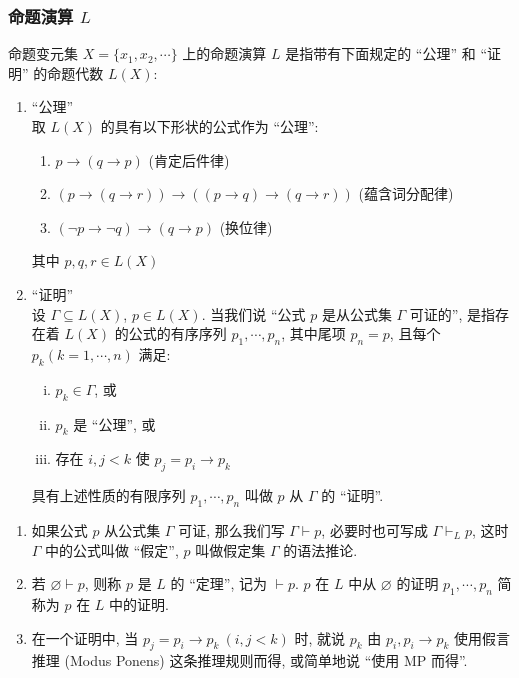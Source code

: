 \documentclass[
    color=black,
    device=normal,
    lang=cn
]{elegantnote}
\begin{document}
\subsubsection{命题演算 \texorpdfstring{$L$}{L}}
\begin{definition}[命题演算 $L$]
    \label{def:2.3}
    命题变元集 $X=\{x_1, x_2,\cdots\}$ 上的命题演算 $L$ 是指带有下面规定的 ``公理'' 和 ``证明'' 的命题代数 $L(X)$:
    \begin{enumerate}[(1)]
        \item ``公理''\\
              取 $L(X)$ 的具有以下形状的公式作为 ``公理'':
              \begin{enumerate}[label=(L\arabic*)]
                  \item $p\to (q\to p)$ \hfill (肯定后件律)
                  \item $(p\to (q\to r))\to ((p\to q)\to (q\to r))$ \hfill (蕴含词分配律)
                  \item $(\lnot p\to \lnot q)\to (q\to p)$ \hfill (换位律)
              \end{enumerate}
              其中 $p,q,r\in L(X)$
        \item ``证明''\\
              设 $\Gamma\subseteq L(X)$, $p\in L(X)$. 当我们说 ``公式 $p$ 是从公式集 $\Gamma$ 可证的'', 是指存在着 $L(X)$ 的公式的有序序列 $p_1, \cdots, p_n$, 其中尾项 $p_n=p$, 且每个 $p_k(k=1,\cdots, n)$ 满足:
              \begin{enumerate}[(i)]
                  \item $p_k\in\Gamma$, 或
                  \item $p_k$ 是 ``公理'', 或
                  \item 存在 $i,j < k$ 使 $p_j=p_i\to p_k$
              \end{enumerate}
              具有上述性质的有限序列 $p_1, \cdots, p_n$ 叫做 $p$ 从 $\Gamma$ 的 ``证明''.
    \end{enumerate}
\end{definition}
\begin{definition}[语法推论]
    \begin{enumerate}[(1)]
        \item 如果公式 $p$ 从公式集 $\Gamma$ 可证, 那么我们写 $\Gamma\vdash p$, 必要时也可写成 $\Gamma\vdash_L p$, 这时 $\Gamma$ 中的公式叫做 ``假定'', $p$ 叫做假定集 $\Gamma$ 的语法推论.
        \item 若 $\varnothing\vdash p$, 则称 $p$ 是 $L$ 的 ``定理'', 记为 $\vdash p$. $p$ 在 $L$ 中从 $\varnothing$ 的证明 $p_1, \cdots, p_n$ 简称为 $p$ 在 $L$ 中的证明.
        \item 在一个证明中, 当 $p_j=p_i\to p_k\ (i,j<k)$ 时, 就说 $p_k$ 由 $p_i, p_i\to p_k$ 使用假言推理 (Modus Ponens) 这条推理规则而得, 或简单地说 ``使用 MP 而得''.
    \end{enumerate}
\end{definition}
\end{document}
